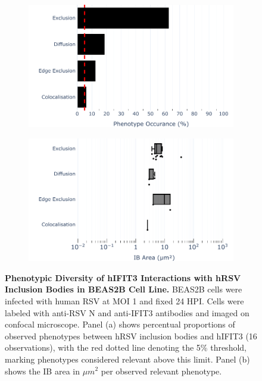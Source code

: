 \begin{figure}
    \begin{subfigure}{0.495\textwidth}
        \caption{}
        \includegraphics[width=1\linewidth]{08. Chapter 3/Figs/02. Infection/03. IFIT3/04. bar_i3_beas2b.pdf} 
    \end{subfigure}
    \begin{subfigure}{0.495\textwidth}
        \caption{}        
        \includegraphics[width=1\linewidth]{08. Chapter 3/Figs/02. Infection/03. IFIT3/05. box_i3_beas2b.pdf}
    \end{subfigure}
    \caption[Phenotypic Diversity of hIFIT3 Interactions with hRSV Inclusion Bodies in BEAS2B Cell Line.]{\textbf{Phenotypic Diversity of hIFIT3 Interactions with hRSV Inclusion Bodies in BEAS2B Cell Line.} BEAS2B cells were infected with human RSV at MOI 1 and fixed 24 HPI. Cells were labeled with anti-RSV N and anti-IFIT3 antibodies and imaged on confocal microscope. Panel (a) shows percentual proportions of observed phenotypes between hRSV inclusion bodies and hIFIT3 (16 observations), with the red dotted line denoting the 5\% threshold, marking phenotypes considered relevant above this limit. Panel (b) shows the IB area in \(\mu m^2\) per observed relevant phenotype.}
    \label{fig:Phenotypic Diversity of hIFIT3 Interactions with hRSV Inclusion Bodies in BEAS2B Cell Line}
\end{figure}

